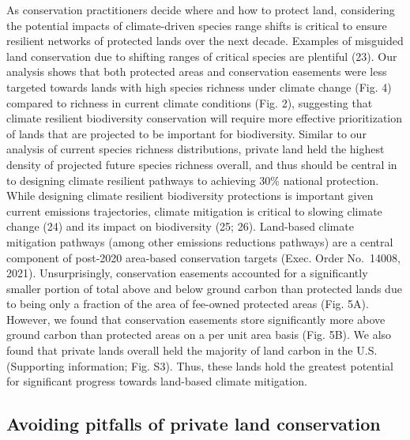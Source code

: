 \documentclass[3p]{elsarticle} %
\begin{document}
As conservation practitioners decide where and how to protect land,
considering the potential impacts of climate-driven species range shifts
is critical to ensure resilient networks of protected lands over the
next decade. Examples of misguided land conservation due to shifting
ranges of critical species are plentiful (23). Our analysis shows that
both protected areas and conservation easements were less targeted
towards lands with high species richness under climate change (Fig. 4)
compared to richness in current climate conditions (Fig. 2), suggesting
that climate resilient biodiversity conservation will require more
effective prioritization of lands that are projected to be important for
biodiversity. Similar to our analysis of current species richness
distributions, private land held the highest density of projected future
species richness overall, and thus should be central in to designing
climate resilient pathways to achieving 30\% national protection. While
designing climate resilient biodiversity protections is important given
current emissions trajectories, climate mitigation is critical to
slowing climate change (24) and its impact on biodiversity (25; 26).
Land-based climate mitigation pathways (among other emissions reductions
pathways) are a central component of post-2020 area-based conservation
targets (Exec. Order No.~14008, 2021). Unsurprisingly, conservation
easements accounted for a significantly smaller portion of total above
and below ground carbon than protected lands due to being only a
fraction of the area of fee-owned protected areas (Fig. 5A). However, we
found that conservation easements store significantly more above ground
carbon than protected areas on a per unit area basis (Fig. 5B). We also
found that private lands overall held the majority of land carbon in the
U.S. (Supporting information; Fig. S3). Thus, these lands hold the
greatest potential for significant progress towards land-based climate
mitigation.

\hypertarget{avoiding-pitfalls-of-private-land-conservation}{%
\subsection{Avoiding pitfalls of private land
conservation}\label{avoiding-pitfalls-of-private-land-conservation}}
\end{document}
